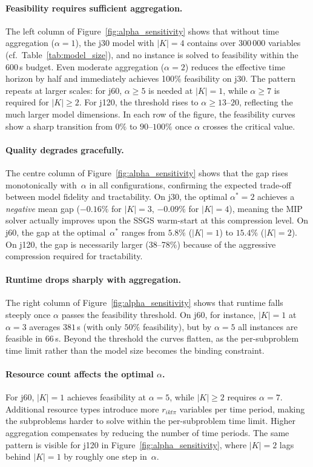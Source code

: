 \paragraph{Feasibility requires sufficient aggregation.}
The left column of Figure~\ref{fig:alpha_sensitivity} shows that
without time aggregation ($\alpha = 1$), the j30 model with
$|K| = 4$ contains over 300\,000 variables
(cf.\ Table~\ref{tab:model_size}), and no instance is solved
to feasibility within the 600\,s budget. Even moderate
aggregation ($\alpha = 2$) reduces the effective time horizon
by half and immediately achieves 100\% feasibility on j30. The
pattern repeats at larger scales: for j60, $\alpha \geq 5$ is
needed at $|K| = 1$, while $\alpha \geq 7$ is required for
$|K| \geq 2$. For j120, the threshold rises to
$\alpha \geq 13$--$20$, reflecting the much larger model
dimensions. In each row of the figure, the feasibility curves
show a sharp transition from $0\%$ to $90$--$100\%$ once
$\alpha$ crosses the critical value.
\paragraph{Quality degrades gracefully.}
The centre column of Figure~\ref{fig:alpha_sensitivity} shows
that the gap rises monotonically with~$\alpha$ in all
configurations, confirming the expected trade-off between model
fidelity and tractability. On j30, the optimal $\alpha^* = 2$
achieves a \emph{negative} mean gap ($-0.16\%$ for $|K| = 3$,
$-0.09\%$ for $|K| = 4$), meaning the MIP solver actually
improves upon the SSGS warm-start at this compression level.
On j60, the gap at the optimal~$\alpha^*$ ranges from $5.8\%$
($|K|=1$) to $15.4\%$ ($|K|=2$). On j120, the gap is
necessarily larger (38--78\%) because of the aggressive
compression required for tractability.
\paragraph{Runtime drops sharply with aggregation.}
The right column of Figure~\ref{fig:alpha_sensitivity} shows
that runtime falls steeply once $\alpha$ passes the feasibility
threshold. On j60, for instance, $|K|=1$ at $\alpha=3$ averages
$381$\,s (with only $50\%$ feasibility), but by $\alpha=5$ all
instances are feasible in $66$\,s. Beyond the threshold the
curves flatten, as the per-subproblem time limit rather than the
model size becomes the binding constraint.
\paragraph{Resource count affects the optimal $\alpha$.}
For j60, $|K| = 1$ achieves feasibility at $\alpha = 5$, while
$|K| \geq 2$ requires $\alpha = 7$. Additional resource types
introduce more $r_{ikt\pi}$ variables per time period, making
the subproblems harder to solve within the per-subproblem time
limit. Higher aggregation compensates by reducing the number of
time periods. The same pattern is visible for j120 in
Figure~\ref{fig:alpha_sensitivity}, where $|K|=2$ lags behind
$|K|=1$ by roughly one step in~$\alpha$.
